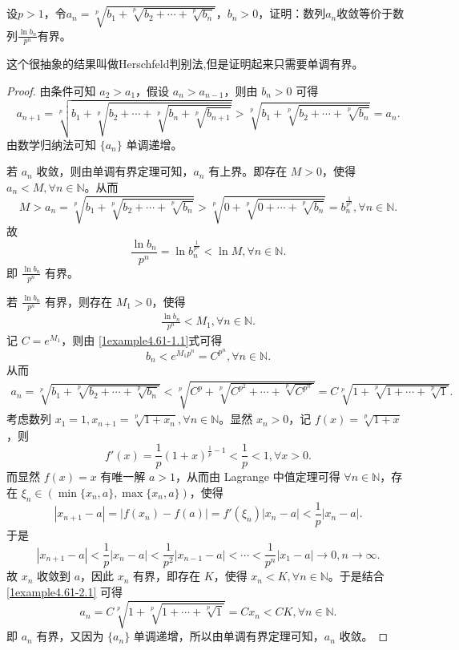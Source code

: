 \documentclass[../../main.tex]{subfiles}%
\begin{document}
\begin{example}[$\,\,$Herschfeld判别法]\label{example:Herschfeld判别法}
设\(p > 1\)，令\(a_n=\sqrt[p]{b_1 + \sqrt[p]{b_2+\cdots+\sqrt[p]{b_n}}}\)，\(b_n>0\)，证明：数列\(a_n\)收敛等价于数列\(\frac{\ln b_n}{p^n}\)有界。
\end{example}
\begin{remark}
这个很抽象的结果叫做Herschfeld判别法,但是证明起来只需要单调有界。
\end{remark}
\begin{proof}
由条件可知 \(a_2 > a_1\)，假设 \(a_n > a_{n - 1}\)，则由 \(b_n > 0\) 可得
\[
a_{n + 1}=\sqrt[p]{b_1+\sqrt[p]{b_2+\cdots +\sqrt[p]{b_n+\sqrt[p]{b_{n + 1}}}}}>\sqrt[p]{b_1+\sqrt[p]{b_2+\cdots +\sqrt[p]{b_n}}}=a_n.
\]
由数学归纳法可知 \(\{ a_n \}\) 单调递增。

若 \(a_n\) 收敛，则由单调有界定理可知，\(a_n\) 有上界。即存在 \(M > 0\)，使得 \(a_n < M,\forall n\in \mathbb{N}\)。从而
\[
M > a_n=\sqrt[p]{b_1+\sqrt[p]{b_2+\cdots +\sqrt[p]{b_n}}}>\sqrt[p]{0+\sqrt[p]{0+\cdots +\sqrt[p]{b_n}}}=b_n^{\frac{1}{p^n}},\forall n\in \mathbb{N}.
\]
故
\[
\frac{\ln b_n}{p^n}=\ln b_n^{\frac{1}{p^n}}<\ln M,\forall n\in \mathbb{N}.
\]
即 \(\frac{\ln b_n}{p^n}\) 有界。

若 \(\frac{\ln b_n}{p^n}\) 有界，则存在 \(M_1 > 0\)，使得
\begin{align}
\frac{\ln b_n}{p^n}<M_1,\forall n\in \mathbb{N}. \label{1example4.61-1.1}
\end{align}
记 \(C = e^{M_1}\)，则由 \eqref{1example4.61-1.1}式可得
\[
b_n<e^{M_1p^n}=C^{p^n},\forall n\in \mathbb{N}.
\]
从而
\begin{align}
a_n=\sqrt[p]{b_1+\sqrt[p]{b_2+\cdots +\sqrt[p]{b_n}}}<\sqrt[p]{C^p+\sqrt[p]{C^{p^2}+\cdots +\sqrt[p]{C^{p^n}}}}=C\sqrt[p]{1+\sqrt[p]{1+\cdots +\sqrt[p]{1}}}. \label{1example4.61-2.1}
\end{align}
考虑数列 \(x_1 = 1,x_{n + 1}=\sqrt[p]{1 + x_n},\forall n\in \mathbb{N}\)。显然 \(x_n > 0\)，记 \(f(x)=\sqrt[p]{1 + x}\)，则
\[
f'(x)=\frac{1}{p}(1 + x)^{\frac{1}{p}-1}<\frac{1}{p}<1,\forall x > 0.
\]
而显然 \(f(x)=x\) 有唯一解 \(a > 1\)，从而由 Lagrange 中值定理可得 \(\forall n\in \mathbb{N}\)，存在 \(\xi_n\in(\min\{ x_n,a \},\max\{ x_n,a \})\)，使得
\[
|x_{n + 1}-a|=|f(x_n)-f(a)|=f'(\xi_n)|x_n - a|<\frac{1}{p}|x_n - a|.
\]
于是
\[
|x_{n + 1}-a|<\frac{1}{p}|x_n - a|<\frac{1}{p^2}|x_{n - 1}-a|<\cdots <\frac{1}{p^n}|x_1 - a|\rightarrow 0,n\rightarrow\infty.
\]
故 \(x_n\) 收敛到 \(a\)，因此 \(x_n\) 有界，即存在 \(K\)，使得 \(x_n < K,\forall n\in \mathbb{N}\)。于是结合 \eqref{1example4.61-2.1} 可得
\[
a_n=C\sqrt[p]{1+\sqrt[p]{1+\cdots +\sqrt[p]{1}}}=Cx_n<CK,\forall n\in \mathbb{N}.
\]
即 \(a_n\) 有界，又因为 \(\{ a_n \}\) 单调递增，所以由单调有界定理可知，\(a_n\) 收敛。
\end{proof}
\end{document}

